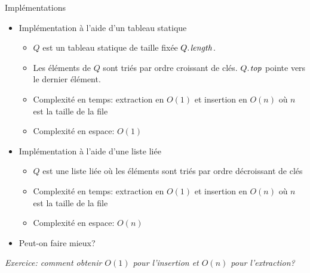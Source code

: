 \begin{frame}{Implémentations}
\begin{itemize}
\item Implémentation à l'aide d'un tableau statique
\begin{itemize}
\item $Q$ est un tableau statique de taille fixée $\attrib{Q}{length}$.
\item Les éléments de $Q$ sont triés par ordre \alert{croissant} de clés. $\attrib{Q}{top}$ pointe vers le dernier élément.
\item Complexité en temps: extraction en $O(1)$ et insertion en $O(n)$ où $n$ est la taille de la file
\item Complexité en espace: $O(1)$
\end{itemize}
\item Implémentation à l'aide d'une liste liée
\begin{itemize}
\item $Q$ est une liste liée où les éléments sont triés par ordre \alert{décroissant} de clés
\item Complexité en temps: extraction en $O(1)$ et insertion en $O(n)$ où $n$ est la taille de la file
\item Complexité en espace: $O(n)$
\end{itemize}
\item Peut-on faire mieux?
\end{itemize}

{\it Exercice: comment obtenir $O(1)$ pour l'insertion et $O(n)$ pour l'extraction?}
\end{frame}

